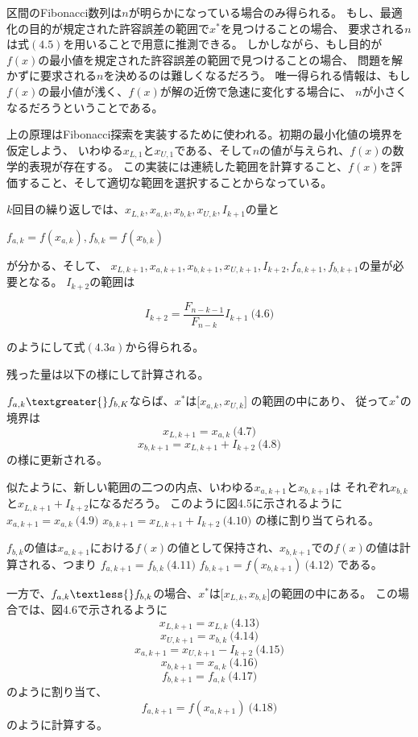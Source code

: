区間のFibonacci数列は$n$が明らかになっている場合のみ得られる。
もし、最適化の目的が規定された許容誤差の範囲で$x^{\ast}$を見つけることの場合、
要求される$n$は式$(4.5)$を用いることで用意に推測できる。
しかしながら、もし目的が$f(x)$の最小値を規定された許容誤差の範囲で見つけることの場合、
問題を解かずに要求される$n$を決めるのは難しくなるだろう。
唯一得られる情報は、もし$f(x)$の最小値が浅く、$f(x)$が解の近傍で急速に変化する場合に、
$n$が小さくなるだろうということである。

上の原理はFibonacci探索を実装するために使われる。初期の最小化値の境界を仮定しよう、
いわゆる$x_{L,1}$と$x_{U,1}$である、そして$n$の値が与えられ、$f(x)$の数学的表現が存在する。
この実装には連続した範囲を計算すること、$f(x)$を評価すること、そして適切な範囲を選択することからなっている。

$k$回目の繰り返しでは、$x_{L,k}, x_{a,k}, x_{b,k},
x_{U,k}, I_{k+1}$の量と

$f_{a,k} = f(x_{a,k}), f_{b,k} = f(x_{b,k})$

が分かる、そして、 $x_{L,k+1}, x_{a,k+1}, x_{b,k+1},
x_{U,k+1}, I_{k+2}, f_{a,k+1}, f_{b,k+1}$の量が必要となる。
$I_{k+2}$の範囲は

$$I_{k+2} =
\frac{F_{n-k-1}}{F_{n-k}}I_{k+1}
\ \text{(4.6)}$$

のようにして式$(4.3a)$から得られる。

残った量は以下の様にして計算される。

$f_{a,k} \textgreater{}
f_{b,K}$ならば、$x^{\ast}$は$\lbrack
x_{a,k} , x_{U,k} \rbrack$ の範囲の中にあり、
従って$x^{\ast}$の境界は $$x_{L,k+1} =
x_{a,k} \ \text{(4.7)}$$ $$x_{b,k+1} = x_{L,k+1} +
I_{k+2} \ \text{(4.8)}$$ の様に更新される。

似たように、新しい範囲の二つの内点、いわゆる$x_{a,k+1}$と$x_{b,k+1}$は
それぞれ$x_{b,k}$と$x_{L,k+1} + I_{k+2}$になるだろう。
このように図4.5に示されるように $x_{a, k+1} = x_{a,k}
\ \text{(4.9)}$ $x_{b, k+1} = x_{L,k+1} + I_{k+2}
\ \text{(4.10)}$ の様に割り当てられる。

$f_{b,k}$の値は$x_{a,k+1}$における$f(x)$の値として保持され、$x_{b,k+1}$での$f(x)$の値は計算される、つまり
$f_{a,k+1} = f_{b,k} \ \text{(4.11)}$ $f_{b,k+1}
= f(x_{b,k+1}) \ \text{(4.12)}$ である。

一方で、$f_{a,k} \textless{}
f_{b,k}$の場合、$x^{\ast}$は$\lbrack
x_{L,k}, x_{b,k} \rbrack$の範囲の中にある。
この場合では、図4.6で示されるように $$x_{L,k+1} = x_{L,k}
\ \text{(4.13)}$$ $$x_{U,k+1} = x_{b,k}
\ \text{(4.14)}$$ $$x_{a,k+1} = x_{U,k+1} - I_{k+2}
\ \text{(4.15)}$$ $$x_{b,k+1} = x_{a,k}
\ \text{(4.16)}$$ $$f_{b,k+1} = f_{a,k}
\ \text{(4.17)}$$ のように割り当て、 $$f_{a,k+1} =
f(x_{a,k+1}) \ \text{(4.18)}$$ のように計算する。

